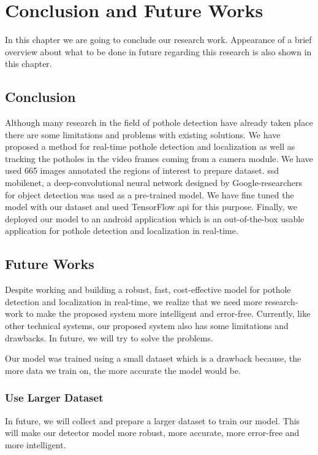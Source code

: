 \chapter{Conclusion and Future Works}
    In this chapter we are going to conclude our research work. Appearance of a brief overview about what to be done in future regarding this research is also shown in this chapter.
    
    \section{Conclusion}
        Although many research in the field of pothole detection have already taken place there are some limitations and problems with existing solutions. We have proposed a method for real-time pothole detection and localization as well as tracking the potholes in the video frames coming from a camera module. We have used 665 images annotated the regions of interest to prepare dataset. \acrfull{ssd} \gls{mobilenet}, a deep-convolutional neural network designed by Google-researchers for object detection was used as a pre-trained model. We have fine tuned the model with our dataset and used TensorFlow \acrshort{api} for this purpose. Finally, we deployed our model to an android application which is an out-of-the-box usable application for pothole detection and localization in real-time.
    
    \section{Future Works}
        Despite working and building a robust, fast, cost-effective model for pothole detection and localization in real-time, we realize that we need more research-work to make the proposed system more intelligent and error-free. Currently, like other technical systems, our proposed system also has some limitations and drawbacks. In future, we will try to solve the problems.
        
        Our model was trained using a small dataset which is a drawback because, the more data we train on, the more accurate the model would be.
        
        \subsection{Use Larger Dataset}
            In future, we will collect and prepare a larger dataset to train our model. This will make our detector model more robust, more accurate, more error-free and more intelligent.
            
